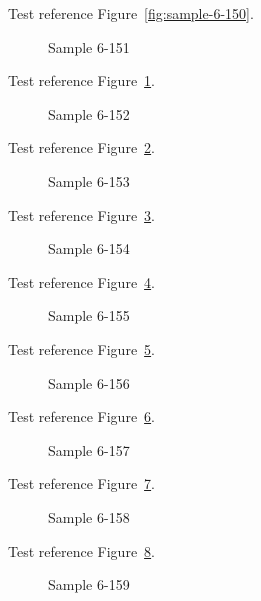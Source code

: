 Test reference Figure~\ref{fig:sample-6-150}.

\begin{figure}[tbhp]
\caption{Sample 6-151}
\label{fig:sample-6-151}
\end{figure}

Test reference Figure~\ref{fig:sample-6-151}.

\begin{figure}[tbhp]
\caption{Sample 6-152}
\label{fig:sample-6-152}
\end{figure}

Test reference Figure~\ref{fig:sample-6-152}.

\begin{figure}[tbhp]
\caption{Sample 6-153}
\label{fig:sample-6-153}
\end{figure}

Test reference Figure~\ref{fig:sample-6-153}.

\begin{figure}[tbhp]
\caption{Sample 6-154}
\label{fig:sample-6-154}
\end{figure}

Test reference Figure~\ref{fig:sample-6-154}.

\begin{figure}[tbhp]
\caption{Sample 6-155}
\label{fig:sample-6-155}
\end{figure}

Test reference Figure~\ref{fig:sample-6-155}.

\begin{figure}[tbhp]
\caption{Sample 6-156}
\label{fig:sample-6-156}
\end{figure}

Test reference Figure~\ref{fig:sample-6-156}.

\begin{figure}[tbhp]
\caption{Sample 6-157}
\label{fig:sample-6-157}
\end{figure}

Test reference Figure~\ref{fig:sample-6-157}.

\begin{figure}[tbhp]
\caption{Sample 6-158}
\label{fig:sample-6-158}
\end{figure}

Test reference Figure~\ref{fig:sample-6-158}.

\begin{figure}[tbhp]
\caption{Sample 6-159}
\label{fig:sample-6-159}
\end{figure}

